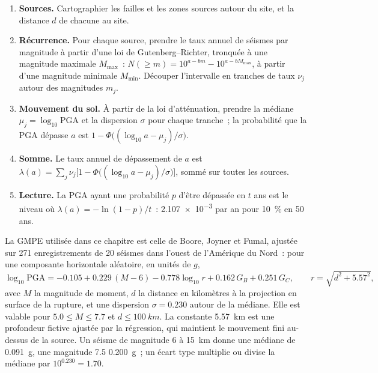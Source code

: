\begin{method}\label{met:b2:geological-hazards:psha}
\begin{enumerate}
\item \textbf{Sources.} Cartographier les failles et les zones
sources autour du site, et la distance $d$ de chacune au site.
\item \textbf{Récurrence.} Pour chaque source, prendre le taux annuel de séismes par
magnitude à partir d'une loi de Gutenberg--Richter, tronquée à une magnitude maximale
$M_{\max}$~: $N(\geq m) = 10^{a - bm} - 10^{a - bM_{\max}}$, à partir d'une magnitude minimale
$M_{\min}$. Découper l'intervalle en tranches de taux $\nu_j$ autour des magnitudes $m_j$.
\item \textbf{Mouvement du sol.} À partir de la loi d'atténuation, prendre la médiane
$\mu_j = \log_{10}\mathrm{PGA}$ et la dispersion $\sigma$ pour chaque tranche~; la
probabilité que la PGA dépasse $a$ est $1 - \Phi\bigl((\log_{10} a - \mu_j)/\sigma\bigr)$.
  \item \textbf{Somme.} Le taux annuel de dépassement de $a$ est $\lambda(a) = \sum_j \nu_j
        \bigl[1 - \Phi\bigl((\log_{10} a - \mu_j)/\sigma\bigr)\bigr]$, sommé sur toutes les sources.
\item \textbf{Lecture.} La PGA ayant une probabilité $p$ d'être dépassée en $t$ ans est le
niveau où $\lambda(a) = -\ln(1 - p)/t$~: \num{2.107e-3} par an pour \qty{10}{\percent} en 50 ans.
\end{enumerate}
\end{method}

La GMPE utilisée dans ce chapitre est celle de Boore, Joyner et Fumal, ajustée sur 271 enregistrements de
20 séismes dans l'ouest de l'Amérique du Nord~: pour une composante horizontale aléatoire, en unités de $g$,
\begin{equation}
\log_{10}\mathrm{PGA} = -0.105 + 0.229\,(M - 6) - 0.778\log_{10} r + 0.162\,G_B + 0.251\,G_C,
\qquad r = \sqrt{d^2 + 5.57^2},
\label{eq:b2:geological-hazards:gmpe}
\end{equation}
avec $M$ la magnitude de moment, $d$ la distance en kilomètres à la projection en surface de la
rupture, et une dispersion $\sigma = 0.230$ autour de la médiane. Elle est valable pour $5.0 \leq M \leq 7.7$ et $d
\leq \qty{100}{km}$. La constante \qty{5.57}{km} est une profondeur fictive ajustée par la régression,
qui maintient le mouvement fini au-dessus de la source. Un séisme de magnitude 6 à \qty{15}{km} donne une médiane de
\qty{0.091}{g}, une magnitude 7.5 \qty{0.200}{g}~; un écart type multiplie ou divise la médiane par
$10^{0.230} = 1.70$.

